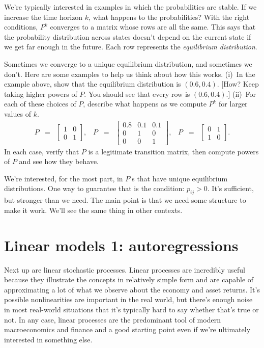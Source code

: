 \documentclass[11pt]{article}
\begin{document}
We're typically interested in examples in which the probabilities are stable.
If we increase the time horizon $k$, what happens to the probabilities?
With the right conditions,
$P^k$ converges to a matrix whose rows are all the same.
This says that the probability distribution across states doesn't depend
on the current state if we get far enough in the future.
Each row represents the {\it equilibrium distribution\/}.

Sometimes we converge to a unique equilibrium distribution,
and sometimes we don't.
Here are some examples to help us think about how this works.
(i)~In the example above, show that the equilibrium distribution is $ (0.6, 0.4)$.
[How?  Keep taking higher powers of $P$.
You should see that every row is $(0.6, 0.4)$.]
(ii)~For each of these choices of $P$, describe what happens as we compute
$P^k$ for larger values of $k$.
\begin{eqnarray*}
    P &=& \left[
            \begin{array}{cc}
            1 & 0 \\  0 & 1
            \end{array}
            \right], \;\;\;
    P \;\;=\;\; \left[
            \begin{array}{ccc}
            0.8 & 0.1 & 0.1 \\ 0 & 1 & 0 \\ 0 & 0 & 1
            \end{array}
            \right], \;\;\;
    P \;\;=\;\; \left[
            \begin{array}{cc}
            0 & 1 \\  1 & 0
            \end{array}
            \right] .
\end{eqnarray*}
In each case, verify that $P$ is a legitimate transition matrix,
then compute powers of $P$ and see how they behave.

We're interested, for the most part, in $P$'s that have
unique equilibrium distributions.
One way to guarantee that is the condition:  $p_{ij} > 0$.
It's sufficient, but stronger than we need.
The main point is that we need some structure to make it work.
We'll see the same thing in other contexts.


\section{Linear models 1:  autoregressions}
\label{sec:autoregressions}

Next up are linear stochastic processes.
Linear processes are incredibly useful because they illustrate the concepts
in relatively simple form and are capable of approximating
a lot of what we observe about the economy and asset returns.
It's possible nonlinearities are important in the real world,
but there's enough noise in most real-world situations
that it's typically hard to say whether that's true or not.
In any case, linear processes are the predominant tool
of modern macroeconomics and finance and a good starting point even
if we're ultimately interested in something else.
\end{document}
